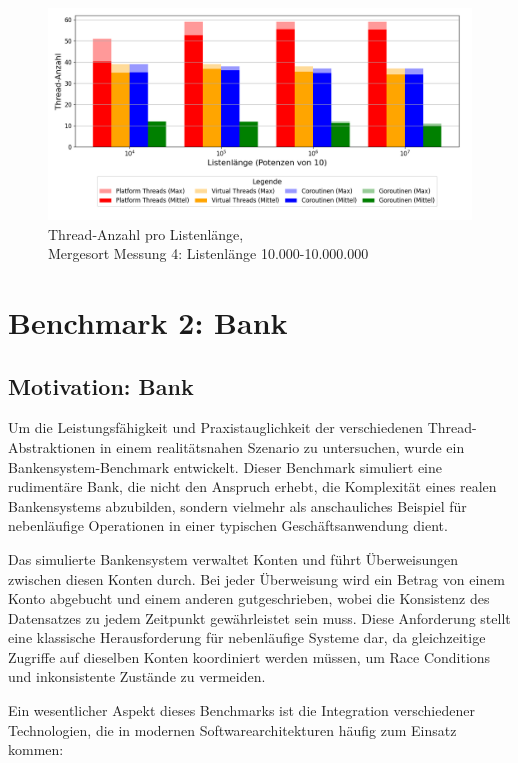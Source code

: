 \documentclass[fontsize=12pt,paper=a4,twoside=semi,parskip=half-,headsepline,headinclude]{scrreprt}
\begin{document}
\begin{figure}[H]
	\centering
	\includegraphics[scale=0.5]{figures/mergesort/Listenlaenge/num_threads_bar_plot.png}
	\caption{Thread-Anzahl pro Listenlänge,\\ Mergesort Messung 4: Listenlänge 10.000-10.000.000}
	\label{fig:mslaengeThreads}
\end{figure}


\section{Benchmark 2: Bank}

\subsection{Motivation: Bank}

Um die Leistungsfähigkeit und Praxistauglichkeit der verschiedenen Thread-Abs\-trak\-tio\-nen in einem realitätsnahen Szenario zu untersuchen, wurde ein Bankensystem-Bench\-mark entwickelt. Dieser Benchmark simuliert eine rudimentäre Bank, die nicht den Anspruch erhebt, die Komplexität eines realen Bankensystems abzubilden, sondern vielmehr als anschauliches Beispiel für nebenläufige Operationen in einer typischen Ge\-schäfts\-an\-wen\-dung dient.

Das simulierte Bankensystem verwaltet Konten und führt Überweisungen zwischen diesen Konten durch. Bei jeder Überweisung wird ein Betrag von einem Konto abgebucht und einem anderen gutgeschrieben, wobei die Konsistenz des Datensatzes zu jedem Zeitpunkt gewährleistet sein muss. Diese Anforderung stellt eine klassische Herausforderung für nebenläufige Systeme dar, da gleichzeitige Zugriffe auf dieselben Konten koordiniert werden müssen, um Race Conditions und inkonsistente Zustände zu vermeiden.

Ein wesentlicher Aspekt dieses Benchmarks ist die Integration verschiedener Technologien, die in modernen Softwarearchitekturen häufig zum Einsatz kommen:
\end{document}
